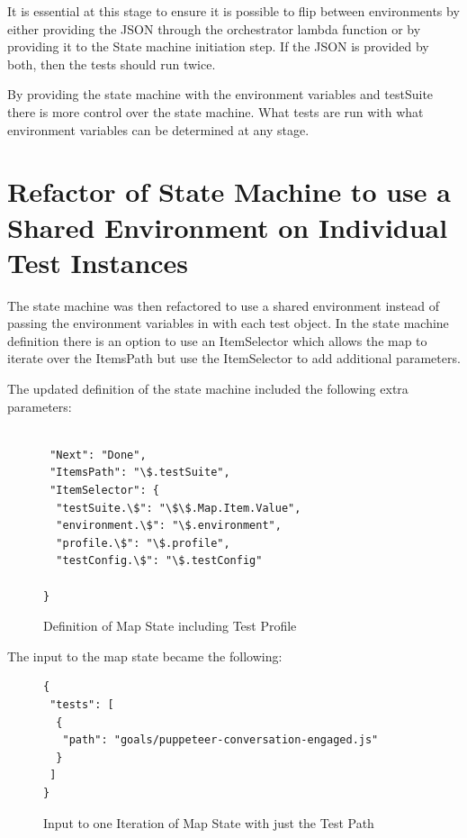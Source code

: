 \documentclass[12pt,a4paper,titlepage]{report}
\begin{document}
It is essential at this stage to ensure it is possible to flip between environments by either providing the JSON through the
orchestrator lambda function or by providing it to the State machine initiation step. If the JSON is provided by both, then the tests should run twice.

By providing the state machine with the environment variables and testSuite there is more control over the state
machine. What tests are run with what environment variables can be determined at any stage.

\section{Refactor of State Machine to use a Shared Environment on Individual Test Instances }

The state machine was then refactored to use a shared environment instead of
passing the environment variables in with each test object. In the state machine definition there is an option to
use an ItemSelector which allows the map to iterate over the ItemsPath but use the ItemSelector to add additional
parameters.

The updated definition of the state machine included the following extra parameters:

\begin{figure}[H]
 \begin{tcolorbox}
  \begin{verbatim}

 "Next": "Done",
 "ItemsPath": "\$.testSuite",
 "ItemSelector": {
  "testSuite.\$": "\$\$.Map.Item.Value",
  "environment.\$": "\$.environment",
  "profile.\$": "\$.profile",
  "testConfig.\$": "\$.testConfig"

}
\end{verbatim}
 \end{tcolorbox}
 \caption{Definition of Map State including Test Profile}
\end{figure}

The input to the map state became the following:

\begin{figure}[ht]
 \begin{tcolorbox}
  \begin{verbatim}
{
 "tests": [
  {
   "path": "goals/puppeteer-conversation-engaged.js"
  }
 ]
}
\end{verbatim}
 \end{tcolorbox}
 \caption{Input to one Iteration of Map State with just the Test Path}
\end{figure}
\end{document}
